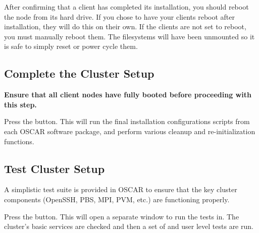After confirming that a client has completed its installation, you
should reboot the node from its hard drive. If you chose to have your
clients reboot after installation, they will do this on their
own. If the clients are not set to reboot, you must manually
reboot them. The filesystems will have been unmounted so it is safe
to simply reset or power cycle them.



\subsection{Complete the Cluster Setup}
\label{det:complete-cluster-setup}

{\bf Ensure that all client nodes have fully booted before proceeding
  with this step.}

Press the  button.  This will run the
final installation configurations scripts from each OSCAR software
package, and perform various cleanup and re-initialization functions.



\subsection{Test Cluster Setup}
\label{det:test-cluster}
            
A simplistic test suite is provided in OSCAR to ensure that the key
cluster components (OpenSSH, PBS, MPI, PVM, etc.) are functioning
properly.

Press the  button. This will open a
separate window to run the tests in.  The cluster's basic services are
checked and then a set of  and user level tests are run.

